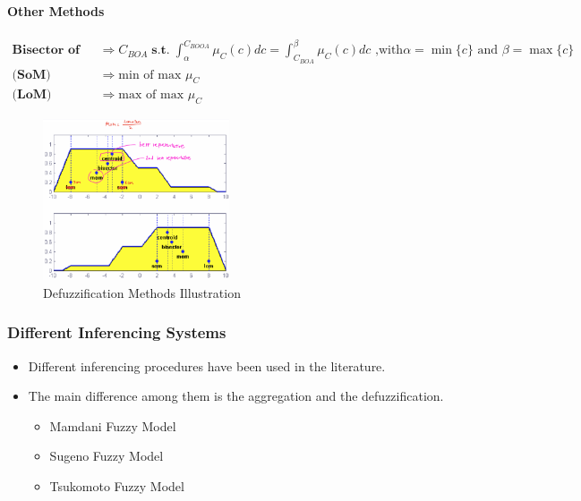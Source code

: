 \documentclass{tron}
\begin{document}
\paragraph{Other Methods}
\begin{align}
	\textbf{Bisector of Area} \quad & \Rightarrow C_{BOA}	 \;\textbf{s.t.} \; \int_{\alpha}^{C_{BOOA}} \mu_C(c) dc = \int_{C_{BOA}}^{\beta} \mu_C(c) dc \text{ ,with} \alpha = \min \{c\} \text{ and } \beta = \max \{c\} \\
	\textbf{(SoM) Smallest of Maximum} \quad & \Rightarrow \text{min of max } \mu_C \\
	\textbf{(LoM) Largest of Maximum} \quad & \Rightarrow \text{max of max } \mu_C 
\end{align}
\begin{figure}[H]
	\centering
	\includegraphics[height=180px]{Figs/FuzzyInferencing/defuzzification}
	\caption{Defuzzification Methods Illustration}
	\label{fig:fuzzy-inf:defuzzification}
\end{figure}

\subsubsection{Different Inferencing Systems}
\begin{itemize}
	\item Different inferencing procedures have been used in the literature.
	\item The main difference among them is the aggregation and the defuzziﬁcation.
	\begin{itemize}
		\item Mamdani Fuzzy Model
		\item Sugeno Fuzzy Model
		\item Tsukomoto Fuzzy Model
	\end{itemize}
\end{itemize}

\end{document}
